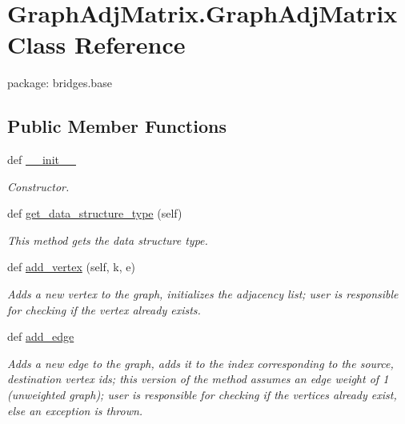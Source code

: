 \hypertarget{class_graph_adj_matrix_1_1_graph_adj_matrix}{}\section{Graph\+Adj\+Matrix.\+Graph\+Adj\+Matrix Class Reference}
\label{class_graph_adj_matrix_1_1_graph_adj_matrix}


package\+: bridges.\+base  


\subsection*{Public Member Functions}
\begin{DoxyCompactItemize}
\item 
def \hyperlink{class_graph_adj_matrix_1_1_graph_adj_matrix_a1e262f9cbc75d2671b97ebc5d4815385}{\+\_\+\+\_\+init\+\_\+\+\_\+}
\begin{DoxyCompactList}\small\item\em Constructor. \end{DoxyCompactList}\item 
def \hyperlink{class_graph_adj_matrix_1_1_graph_adj_matrix_a74dbe9e3b81109e04f93ff48bdeaed3b}{get\+\_\+data\+\_\+structure\+\_\+type} (self)
\begin{DoxyCompactList}\small\item\em This method gets the data structure type. \end{DoxyCompactList}\item 
def \hyperlink{class_graph_adj_matrix_1_1_graph_adj_matrix_a5497b58e61b015b89dac6f709e615e47}{add\+\_\+vertex} (self, k, e)
\begin{DoxyCompactList}\small\item\em Adds a new vertex to the graph, initializes the adjacency list; user is responsible for checking if the vertex already exists. \end{DoxyCompactList}\item 
def \hyperlink{class_graph_adj_matrix_1_1_graph_adj_matrix_a6192c6ff3069be79234a0a393190859d}{add\+\_\+edge}
\begin{DoxyCompactList}\small\item\em Adds a new edge to the graph, adds it to the index corresponding to the source, destination vertex ids; this version of the method assumes an edge weight of 1 (unweighted graph); user is responsible for checking if the vertices already exist, else an exception is thrown. \end{DoxyCompactList}\item 

\end{DoxyCompactItemize}
